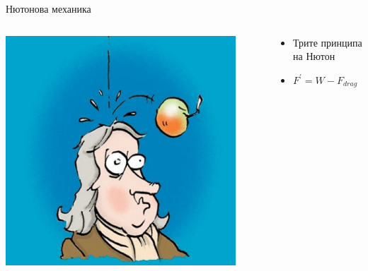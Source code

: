 \documentclass[10pt,a4paper]{beamer}
\begin{document}
        \begin{frame}{ Нютонова механика }
            \begin{columns}
                \begin{column}{0.5\textwidth}
                    \includegraphics[width=0.9\textwidth]{images/newton_apple.jpg}
                \end{column}
                \begin{column}{0.5\textwidth}
                    \begin{itemize}
                        \item Трите принципа на Нютон
                        \item $ F^{\prime} = W - F_{drag} $
                    \end{itemize}
                \end{column}
            \end{columns}
        \end{frame}
        
\end{document}
